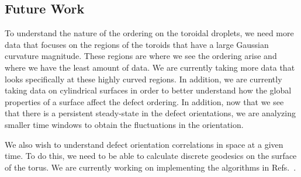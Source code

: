 \subsection{Future Work}
To understand the nature of the ordering on the toroidal droplets, we need more data that focuses on the regions of the toroids that have a large Gaussian curvature magnitude.
These regions are where we see the ordering arise and where we have the least amount of data.
We are currently taking more data that looks specifically at these highly curved regions.
In addition, we are currently taking data on cylindrical surfaces in order to better understand how the global properties of a surface affect the defect ordering.
In addition, now that we see that there is a persistent steady-state in the defect orientations, we are analyzing smaller time windows to obtain the fluctuations in the orientation.

We also wish to understand defect orientation correlations in space at a given time.
To do this, we need to be able to calculate discrete geodesics on the surface of the torus.
We are currently working on implementing the algorithms in Refs.~\cite{RN322,RN323}.



